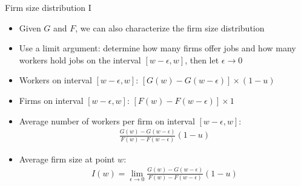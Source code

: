 \documentclass[9pt]{beamer}
\newcommand{\bit}{\begin{itemize}}
\newcommand{\eit}{\end{itemize}}
\newcommand{\lb}{\label}
\begin{document}
\begin{frame}{Firm size distribution I}

\bit
\setlength\itemsep{1.5em}

\item Given $G$ and $F$, we can also characterize the firm size distribution

\item Use a limit argument: determine how many firms offer jobs and how many workers hold jobs on the interval $[w-\epsilon,w]$, then let $\epsilon \rightarrow 0$

\item Workers on interval $[w-\epsilon,w]$: $\left[G(w)-G(w-\epsilon)\right]\times (1-u)$

\item Firms on interval $[w-\epsilon,w]$: $\left[F(w)-F(w-\epsilon)\right] \times 1$

\item Average number of workers per firm on interval $[w-\epsilon,w]$:
\begin{eqnarray}
\frac{G(w)-G(w-\epsilon)}{F(w)-F(w-\epsilon)}(1-u) \nonumber
\end{eqnarray}

\item Average firm size at point $w$:
\begin{eqnarray}
\lb{firm_size_dist}
I(w) = \lim\limits_{\epsilon \rightarrow 0}\frac{G(w)-G(w-\epsilon)}{F(w)-F(w-\epsilon)}(1-u)
\end{eqnarray}

\eit

\end{frame}
\end{document}
